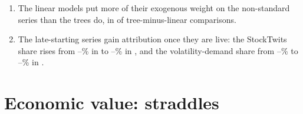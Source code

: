 \begin{enumerate}
  \rhfipNExog{} exogenous series at each of the \rhfipNOrigins{} origins, yet the remaining series change their QLIKE by
  \rhabLgbmFullVsAddRmFomcAllPct\% (LightGBM) and \rhabXgbFullVsAddRmFomcAllPct\% (XGBoost).
\item The linear models put more of their exogenous weight on the non-standard series than the trees do, in
  \rhfipNDLess{} of \rhfipNDAll{} tree-minus-linear comparisons.
\item The late-starting series gain attribution once they are live: the StockTwits share rises from
  \rhfilStwPreMin--\rhfilStwPreMax\% in \rhfilStwPreYears{} to \rhfilStwLiveMin--\rhfilStwLiveMax\% in
  \rhfilStwLiveYears, and the volatility-demand share from \rhfilVdPreMin--\rhfilVdPreMax\% to
  \rhfilVdLiveMin--\rhfilVdLiveMax\% in \rhfilVdLiveYears.
\end{enumerate}





\section{Economic value: \zdte{} straddles}
\label{sec:rh_econ}\label{sec:rh_econ_measures}

